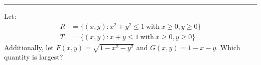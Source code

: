 \documentclass{ximera}
\begin{document}
\hrule

\begin{problem}
  Let:
  \begin{align*}
    R &= \{(x,y): x^2 +y^2 \le 1~\text{with}~x\ge0, y\ge0\}\\
    T &= \{(x,y): x+y\le 1~\text{with}~x\ge0, y\ge0\}
  \end{align*}
  Additionally, let $F(x,y) = \sqrt{1-x^2-y^2}$ and $G(x,y) = 1-x-y$.
  Which quantity is largest?
  \begin{multipleChoice}
      \pdfOnly{\end{multicols}}
  \end{multipleChoice}
  \end{problem}
\end{document}
